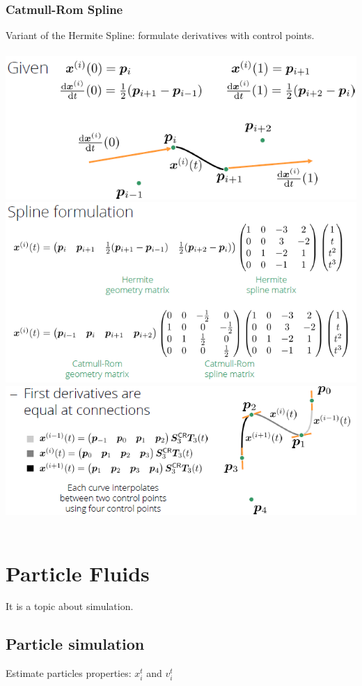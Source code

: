 \documentclass{article}
\begin{document}
\subsubsection{Catmull-Rom Spline}
Variant of the Hermite Spline: formulate derivatives with control points.\\\\
\includegraphics[scale=0.5]{image88.png}
\includegraphics[scale=0.5]{image89.png}\\
\includegraphics[scale=0.5]{image90.png}\\\\
\section{Particle Fluids}
It is a topic about simulation.\\
\subsection{Particle simulation}
Estimate particles properties: $x_i^t$ and $v_i^t$
\end{document}

